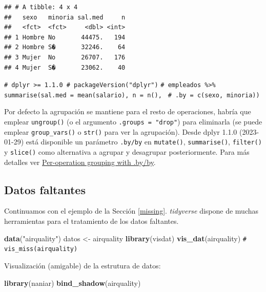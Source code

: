 \documentclass[
]{book}
\newenvironment{Shaded}{\begin{snugshade}}{\end{snugshade}}
\newcommand{\CommentTok}[1]{\textcolor[rgb]{0.56,0.35,0.01}{\textit{#1}}}
\newcommand{\FunctionTok}[1]{\textcolor[rgb]{0.13,0.29,0.53}{\textbf{#1}}}
\newcommand{\NormalTok}[1]{#1}
\newcommand{\OtherTok}[1]{\textcolor[rgb]{0.56,0.35,0.01}{#1}}
\newcommand{\StringTok}[1]{\textcolor[rgb]{0.31,0.60,0.02}{#1}}
\theoremstyle{break}
\theoremstyle{nonumberplain}
\renewcommand{\CommentTok}[1]{\textcolor[rgb]{0.41,0.41,0.41}{\texttt{#1}}}
\begin{document}
\begin{verbatim}
## # A tibble: 4 x 4
##   sexo   minoria sal.med     n
##   <fct>  <fct>     <dbl> <int>
## 1 Hombre No       44475.   194
## 2 Hombre S�       32246.    64
## 3 Mujer  No       26707.   176
## 4 Mujer  S�       23062.    40
\end{verbatim}

\begin{Shaded}
\begin{Highlighting}[]
\CommentTok{\# dplyr \textgreater{}= 1.1.0 \# packageVersion("dplyr")}
\CommentTok{\# empleados \%\textgreater{}\% summarise(sal.med = mean(salario), n = n(), }
\CommentTok{\#                         .by = c(sexo, minoria))}
\end{Highlighting}
\end{Shaded}

Por defecto la agrupación se mantiene para el resto de operaciones, habría que emplear \texttt{ungroup()} (o el argumento \texttt{.groups\ =\ "drop"}) para eliminarla (se puede emplear \texttt{group\_vars()} o \texttt{str()} para ver la agrupación).
Desde dplyr 1.1.0 (2023-01-29) está disponible un parámetro \texttt{.by/by} en \texttt{mutate()}, \texttt{summarise()}, \texttt{filter()} y \texttt{slice()} como alternativa a agrupar y desagrupar posteriormente.
Para más detalles ver \href{https://dplyr.tidyverse.org/reference/dplyr_by.html}{Per-operation grouping with .by/by}.

\subsection{Datos faltantes}\label{tidyr-missing}

Continuamos con el ejemplo de la Sección \ref{missing}.
\emph{tidyverse} dispone de muchas herramientas para el tratamiento de los datos faltantes.

\begin{Shaded}
\begin{Highlighting}[]
\FunctionTok{data}\NormalTok{(}\StringTok{"airquality"}\NormalTok{)}
\NormalTok{datos }\OtherTok{\textless{}{-}}\NormalTok{ airquality}
\FunctionTok{library}\NormalTok{(visdat)}
\FunctionTok{vis\_dat}\NormalTok{(airquality)}
\CommentTok{\# vis\_miss(airquality)}
\end{Highlighting}
\end{Shaded}

Visualización (amigable) de la estrutura de datos:

\begin{Shaded}
\begin{Highlighting}[]
\FunctionTok{library}\NormalTok{(naniar)}
\FunctionTok{bind\_shadow}\NormalTok{(airquality)}
\end{Highlighting}
\end{Shaded}
\end{document}
